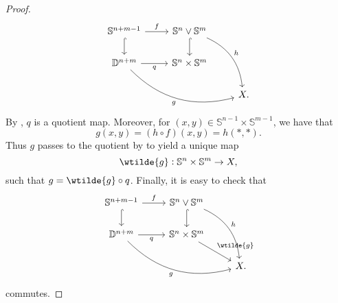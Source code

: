 \begin{proof}
\begin{equation*}
\begin{tikzcd}
			\mathbb{S}^{n + m - 1} \arrow[r,"f"]\arrow[d,hook] & \mathbb{S}^n \vee \mathbb{S}^m \arrow[d,hook]\arrow[ddr,bend left,"h"]\\
			\mathbb{D}^{n + m} \arrow[r,"q"']\arrow[drr,bend right,"g"'] & \mathbb{S}^n \times \mathbb{S}^m\\
			& & X.
		\end{tikzcd}
	\end{equation*}
	By \cite[186]{munkres:topology:2000}, $q$ is a quotient map. Moreover, for $(x,y) \in \mathbb{S}^{n - 1} \times \mathbb{S}^{m - 1}$, we have that
	\begin{equation*}
		g(x,y) = (h \circ f)(x,y) = h(\ast,\ast).
	\end{equation*}
	Thus $g$ passes to the quotient by \cite[72]{lee:topological_manifolds:2011} to yield a unique map
	\begin{equation*}
		\wtilde{g} : \mathbb{S}^n \times \mathbb{S}^m \to X,
	\end{equation*}
	\noindent such that $g = \wtilde{g} \circ q$. Finally, it is easy to check that
	\begin{equation*}
		\begin{tikzcd}
			\mathbb{S}^{n + m - 1} \arrow[r,"f"]\arrow[d,hook] & \mathbb{S}^n \vee \mathbb{S}^m \arrow[d,hook]\arrow[ddr,bend left,"h"]\\
			\mathbb{D}^{n + m} \arrow[r,"q"']\arrow[drr,bend right,"g"'] & \mathbb{S}^n \times \mathbb{S}^m\arrow[dr,"\wtilde{g}"]\\
			& & X.
		\end{tikzcd}
	\end{equation*}
	\noindent commutes.
\end{proof}

